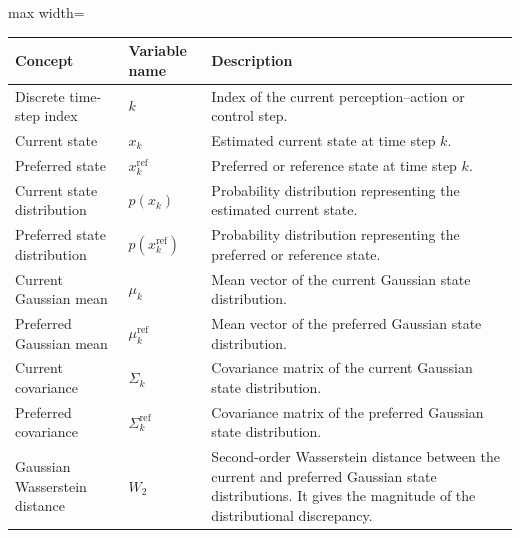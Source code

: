 \documentclass[a4paper]{article}
\begin{document}
   \begin{table}[H]
      \centering
      \small
      \setlength{\tabcolsep}{4pt}
      \begin{adjustbox}{max width=\textwidth}
      \begin{tabular}{p{} p{} p{}}
         \hline
         \textbf{Concept} & \textbf{Variable name} & \textbf{Description} \\
         \hline

         Discrete time-step index
         & $k$
         & Index of the current perception--action or control step. \\

         Current state
         & $x_k$
         & Estimated current state at time step $k$. \\

         Preferred state
         & $x_k^{\mathrm{ref}}$
         & Preferred or reference state at time step $k$. \\

         Current state distribution
         & $p(x_k)$
         & Probability distribution representing the estimated current state. \\

         Preferred state distribution
         & $p(x_k^{\mathrm{ref}})$
         & Probability distribution representing the preferred or reference state. \\

         Current Gaussian mean
         & $\mu_k$
         & Mean vector of the current Gaussian state distribution. \\

         Preferred Gaussian mean
         & $\mu_k^{\mathrm{ref}}$
         & Mean vector of the preferred Gaussian state distribution. \\

         Current covariance
         & $\Sigma_k$
         & Covariance matrix of the current Gaussian state distribution. \\

         Preferred covariance
         & $\Sigma_k^{\mathrm{ref}}$
         & Covariance matrix of the preferred Gaussian state distribution. \\

         Gaussian Wasserstein distance
         & $W_2$
         & Second-order Wasserstein distance between the current and preferred Gaussian state distributions. It gives the magnitude of the distributional discrepancy. \\


\end{tabular}
\end{adjustbox}
\end{table}
\end{document}
